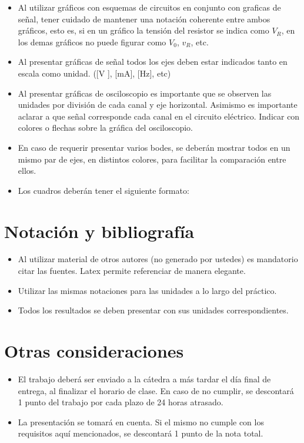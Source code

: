 \documentclass[10pt]{article}
\begin{document}
\begin{itemize}
    \item Al utilizar gráficos con esquemas de circuitos en conjunto con graficas de señal, tener cuidado de mantener una notación coherente entre ambos gráficos, esto es, si en un gráfico la tensión del resistor se indica como $V_R$, en los demas gráficos no puede figurar como $V_0$, $v_R$, etc.
    \item Al presentar gráficas de señal todos los ejes deben estar indicados tanto en escala como unidad. ([V ], [mA], [Hz], etc)
    \item Al presentar gráficas de osciloscopio es importante que se observen las unidades por división de cada canal y eje horizontal. Asimismo es importante aclarar a que señal corresponde cada canal en el circuito eléctrico. Indicar con colores o flechas sobre la gráfica del osciloscopio.
    \item En caso de requerir presentar varios bodes, se deberán mostrar todos en un mismo par de ejes, en distintos colores, para facilitar la comparación entre ellos.
    \item Los cuadros deberán tener el siguiente formato: 

    \begin{figure} [H]
        \centering
    \end{figure}

\end{itemize}
    


\section{Notación y bibliografía}

\begin{itemize}
    \item Al utilizar material de otros autores (no generado por ustedes) es mandatorio citar las fuentes. Latex permite referenciar de manera elegante.
    \item Utilizar las mismas notaciones para las unidades a lo largo del práctico.
    \item Todos los resultados se deben presentar con sus unidades correspondientes.
\end{itemize}


\section{Otras consideraciones}

\begin{itemize}
    \item El trabajo deberá ser enviado a la cátedra a más tardar el día final de entrega, al finalizar el horario de clase. En caso de no cumplir, se descontará 1 punto del trabajo por cada plazo de 24 horas atrasado.
    \item La presentación se tomará en cuenta. Si el mismo no cumple con los requisitos aquí mencionados, se descontará 1 punto de la nota total.
\end{itemize}
\end{document}

